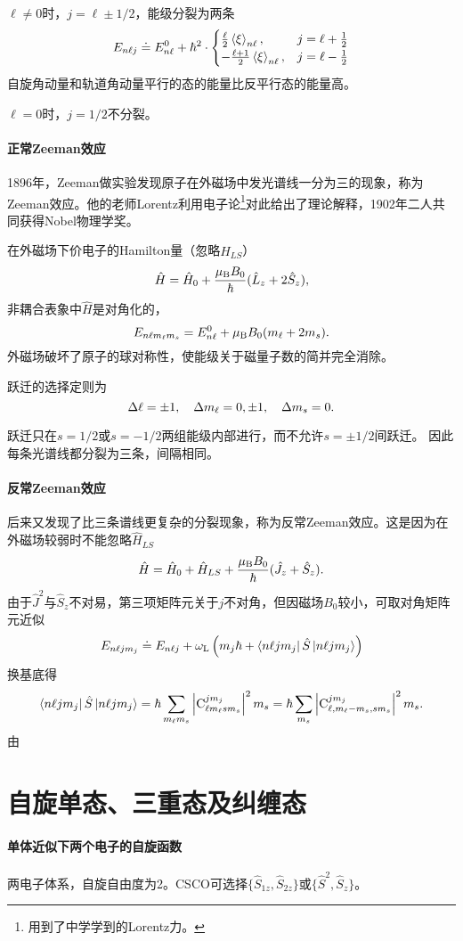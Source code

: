 $\ell\neq 0$时，$j=\ell\pm 1/2$，能级分裂为两条
\[
E_{n\ell j}\doteq E_{n\ell}^0+\hbar^2\cdot\begin{cases}
	\frac{\ell}2\left\langle \xi\right\rangle_{n\ell},& j=\ell+\frac12\\
	-\frac{\ell+1}2\left\langle \xi\right\rangle_{n\ell},& j=\ell-\frac12
\end{cases}
\]
自旋角动量和轨道角动量平行的态的能量比反平行态的能量高。

$\ell=0$时，$j=1/2$不分裂。
\paragraph{正常Zeeman效应}1896年，Zeeman做实验发现原子在外磁场中发光谱线一分为三的现象，称为Zeeman效应。他的老师Lorentz利用电子论\footnote{用到了中学学到的Lorentz力。}对此给出了理论解释，1902年二人共同获得Nobel物理学奖。

在外磁场下价电子的Hamilton量（忽略$\hat H_{LS}$）
\[
	\hat H=\hat H_0+\frac{\mu_\mathrm B B_0}\hbar(\hat L_z+2\hat S_z),
\]
非耦合表象中$\hat H$是对角化的，
\[
E_{n\ell m_\ell m_s}=E_{n\ell}^0+\mu_\mathrm B B_0(m_\ell+2m_s).
\]
外磁场破坏了原子的球对称性，使能级关于磁量子数的简并完全消除。%

跃迁的选择定则为
\[
	\Delta\ell=\pm 1,\quad \Delta m_\ell=0,\pm 1,\quad \Delta m_s=0.
\]
\begin{remark}
	跃迁只在$s=1/2$或$s=-1/2$两组能级内部进行，而不允许$s=\pm 1/2$间跃迁。
	因此每条光谱线都分裂为三条，间隔相同。
\end{remark}
\paragraph{反常Zeeman效应}
后来又发现了比三条谱线更复杂的分裂现象，称为反常Zeeman效应。这是因为在外磁场较弱时不能忽略$\hat H_{LS}$
\[
	\hat H=\hat H_0+\hat H_{LS}+\frac{\mu_\mathrm B B_0}\hbar(\hat J_z+\hat S_z).
\]
由于$\hat J^2$与$\hat S_z$不对易，第三项矩阵元关于$j$不对角，但因磁场$B_0$较小，可取对角矩阵元近似
\[
E_{n\ell jm_j}\doteq E_{n\ell j}+\omega_\mathrm L\left(m_j\hbar+\left\langle n\ell jm_j\right\vert\hat S\left\vert n\ell jm_j\right\rangle\right)
\]
换基底得
\[
	\left\langle n\ell jm_j\right\vert\hat S\left\vert n\ell jm_j\right\rangle=\hbar\sum_{m_\ell m_s}\left\lvert\operatorname{C}_{\ell m_\ell sm_s}^{jm_j}\right\rvert^2m_s=\hbar\sum_{m_s}\left\lvert\operatorname{C}_{\ell,m_\ell-m_s,sm_s}^{jm_j}\right\rvert^2m_s.
\]
由
\section{自旋单态、三重态及纠缠态}
\paragraph{单体近似下两个电子的自旋函数}
两电子体系，自旋自由度为2。CSCO可选择$\{\hat S_{1z},\hat S_{2z}\}$或$\{\hat S^2,\hat S_z\}$。


